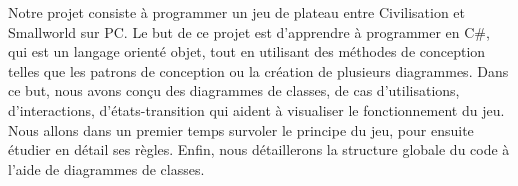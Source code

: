 Notre projet consiste à programmer un jeu de plateau entre Civilisation et Smallworld sur PC. Le but de ce projet est d'apprendre à programmer en C\#, qui est un langage orienté objet, tout en utilisant des méthodes de conception telles que les patrons de conception ou la création de plusieurs diagrammes. Dans ce but, nous avons conçu des diagrammes de classes, de cas d'utilisations, d'interactions, d'états-transition qui aident à visualiser le fonctionnement du jeu.
Nous allons dans un premier temps survoler le principe du jeu, pour ensuite étudier en détail ses règles. Enfin, nous détaillerons la structure globale du code à l'aide de diagrammes de classes.


